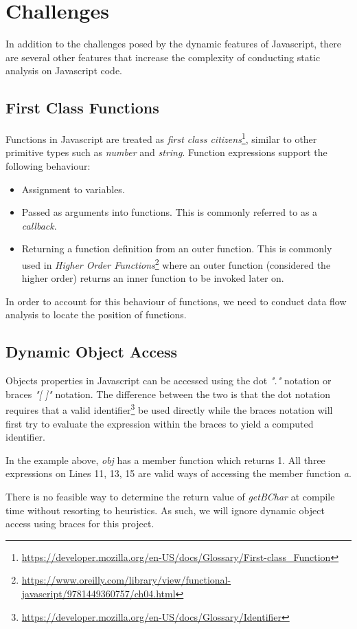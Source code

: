 \section{Challenges}

In addition to the challenges posed by the dynamic features of Javascript, there are several other features that increase the complexity of conducting static analysis on Javascript code.

\subsection{First Class Functions}

Functions in Javascript are treated as \textit{first class citizens}\footnote{\url{https://developer.mozilla.org/en-US/docs/Glossary/First-class_Function}}, similar to other primitive types such as \textit{number} and \textit{string}. Function expressions support the following behaviour:

\begin{itemize}
    \item{Assignment to variables.}
    \item{Passed as arguments into functions. This is commonly referred to as a \textit{callback}.}
    \item{Returning a function definition from an outer function. This is commonly used in \textit{Higher Order Functions}\footnote{\url{https://www.oreilly.com/library/view/functional-javascript/9781449360757/ch04.html}} where an outer function (considered the higher order) returns an inner function to be invoked later on.} 
\end{itemize}

In order to account for this behaviour of functions, we need to conduct data flow analysis to locate the position of functions.

\subsection{Dynamic Object Access}

Objects properties in Javascript can be accessed using the dot \textit{"."} notation or braces \textit{"[ ]"} notation. The difference between the two is that the dot notation requires that a valid identifier\footnote{\url{https://developer.mozilla.org/en-US/docs/Glossary/Identifier}} be used directly while the braces notation will first try to evaluate the expression within the braces to yield a computed identifier.



In the example above, \textit{obj} has a member function which returns 1. All three expressions on Lines 11, 13, 15 are valid ways of accessing the member function \textit{a}.

There is no feasible way to determine the return value of \textit{getBChar} at compile time without resorting to heuristics. As such, we will ignore dynamic object access using braces for this project.
